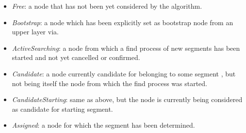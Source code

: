 \begin{itemize}
\item{\emph{Free}}: a node that has  not been yet considered  by the \disr{} algorithm.
\item{\emph{Bootstrap}}: a node which has been explicitly set as bootstrap node from
an upper layer via. 
\item{\emph{ActiveSearching}}: a node from which a find process of new segments has
been started and not yet cancelled or confirmed. 
\item{\emph{Candidate}}: a node currently candidate for belonging to some segment
, but not being itself the node from which the find process was started. 

\item{\emph{CandidateStarting}}: same as above, but the node is currently being considered as candidate
for starting segment. 
\item{\emph{Assigned}}: a node for which the segment has been determined.  
\end{itemize}


